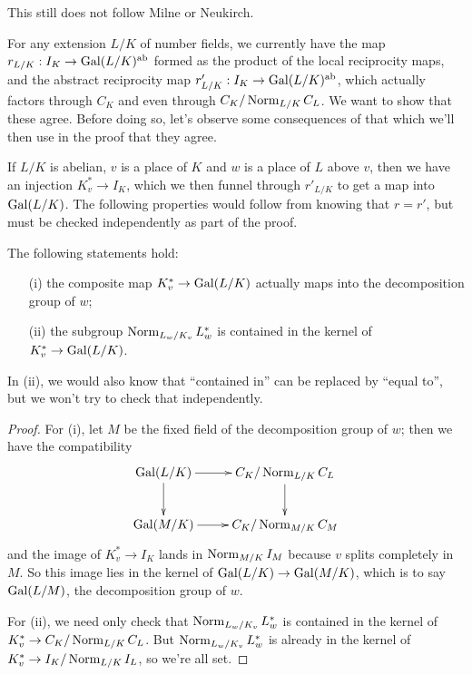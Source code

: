 
 This still does not follow Milne or Neukirch.

\medskip
For any extension $L/K$ of number fields,
we currently have the map $r_{L/K}: I_K \to \operatorname{Gal}(L/K)^{\operatorname{ab}}$
formed as the product of the local reciprocity maps,
and the abstract reciprocity map $r'_{L/K}: I_K \to \operatorname{Gal}(L/K)^{\operatorname{ab}}$,
which actually factors through $C_K$ and even through $C_K/\operatorname{Norm}_{L/K} C_L$.
We want to show that these agree. Before doing so, let's observe some
consequences of that which we'll then use in the proof that they agree.

If $L/K$ is abelian, $v$ is a place of $K$ and $w$ is a place of $L$
above $v$, then we have an injection $K_v^* \to I_K$, which we then
funnel through $r'_{L/K}$ to get a map into $\operatorname{Gal}(L/K)$.
The following properties would follow from knowing that $r = r'$, but must be checked independently as part of the proof.
\begin{lemma} \label{L:reciprocity corollaries}
The following statements hold:
\begin{enumerate}
\item[(i)] the composite map $K_v^* \to \operatorname{Gal}(L/K)$ actually maps into
the decomposition group of $w$;
\item[(ii)] the subgroup $\operatorname{Norm}_{L_w/K_v} L_w^*$ is contained in the kernel
of $K_v^* \to \operatorname{Gal}(L/K)$.
\end{enumerate}
\end{lemma}
In (ii), we would also know that ``contained in'' can be replaced by 
``equal to'', but we won't try to check that independently.
\begin{proof}
For (i), let $M$ be the
fixed field of the decomposition group of $w$; then we have the compatibility
\[
\xymatrix{
\Gal(L/K) \ar[r] \ar[d] & C_K/\Norm_{L/K} C_L \ar[d] \\
\Gal(M/K) \ar[r] & C_K/\Norm_{M/K} C_M
}
\]
and the image of $K_v^* \to I_K$ lands in $\operatorname{Norm}_{M/K} I_M$ because
$v$ splits completely in $M$. So this image lies in the kernel of
$\operatorname{Gal}(L/K) \to \operatorname{Gal}(M/K)$, which is to say $\operatorname{Gal}(L/M)$, the decomposition
group of $w$.

For (ii), we need only check that 
$\operatorname{Norm}_{L_w/K_v} L_w^*$ is contained in the kernel
of $K_v^* \to C_K/\operatorname{Norm}_{L/K} C_L$.
But $\operatorname{Norm}_{L_w/K_v} L_w^*$ is already in the kernel of
$K_v^* \to I_K/\operatorname{Norm}_{L/K} I_L$, so we're all set.
\end{proof}

